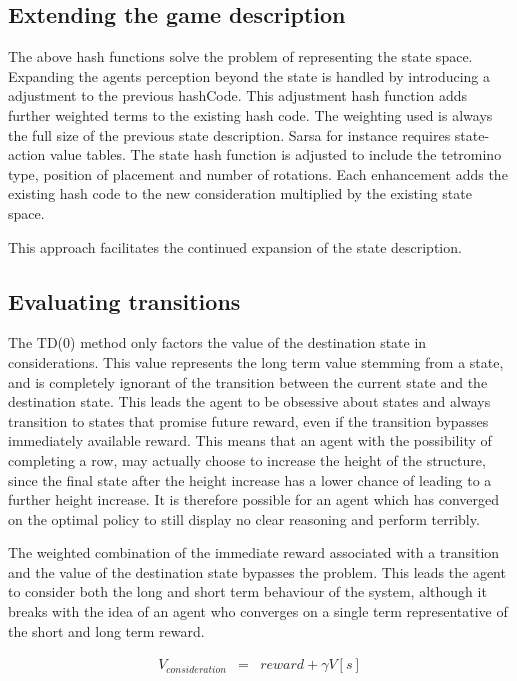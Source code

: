 \documentclass{rucsthesis}
\begin{document}
\subsection{Extending the game description}

The above hash functions solve the problem of representing the state space. Expanding the agents perception beyond the state is handled by introducing a adjustment to the previous hashCode. This adjustment hash function adds further weighted terms to the existing hash code. The weighting used is always the full size of the previous state description. Sarsa for instance requires state-action value tables. The state hash function is adjusted to include the tetromino type, position of placement and number of rotations. Each enhancement adds the existing hash code to the new consideration multiplied by the existing state space.

This approach facilitates the continued expansion of the state description. 
 
\subsection{Evaluating transitions}

The TD(0) method only factors the value of the destination state in considerations. This value represents the long term value stemming from a state, and is completely ignorant of the transition between the current state and the destination state. This leads the agent to be obsessive about states and always transition to states that promise future reward, even if the transition bypasses immediately available reward. This means that an agent with the possibility of completing a row, may actually choose to increase the height of the structure, since the final state after the height increase has a lower chance of leading to a further height increase. It is therefore possible for an agent which has converged on the optimal policy to still display no clear reasoning and perform terribly. 

The weighted combination of the immediate reward associated with a transition and the value of the destination state bypasses the problem. This leads the agent to consider both the long and short term behaviour of the system, although it breaks with the idea of an agent who converges on a single term representative of the short and long term reward.

\begin{eqnarray*}
V_{consideration} & = & reward + \gamma V[s]
\end{eqnarray*} 
 
\end{document}
